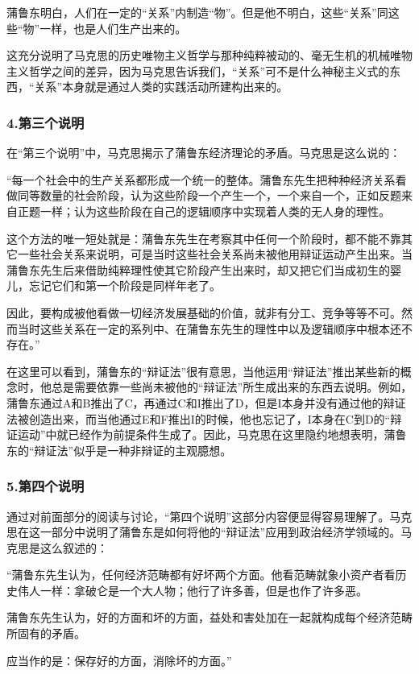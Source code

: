 \documentclass[a4paper,twoside,12pt,AutoFakeBold]{ctexart}
\begin{document}
\begin{adjustwidth}{2em}{2em}
    \qquad\fangsong
    蒲鲁东明白，人们在一定的“关系”内制造“物”。但是他不明白，这些“关系”同这些“物”一样，也是人们生产出来的。
\end{adjustwidth}
这充分说明了马克思的历史唯物主义哲学与那种纯粹被动的、毫无生机的机械唯物主义哲学之间的差异，因为马克思告诉我们，“关系”可不是什么神秘主义式的东西，“关系”本身就是通过人类的实践活动所建构出来的。

\subsubsection{4.第三个说明}

在“第三个说明”中，马克思揭示了蒲鲁东经济理论的矛盾。马克思是这么说的：

\begin{adjustwidth}{2em}{2em}
    \qquad\fangsong
    “每一个社会中的生产关系都形成一个统一的整体。蒲鲁东先生把种种经济关系看做同等数量的社会阶段，认为这些阶段一个产生一个，一个来自一个，正如反题来自正题一样；认为这些阶段在自己的逻辑顺序中实现着人类的无人身的理性。

这个方法的唯一短处就是：蒲鲁东先生在考察其中任何一个阶段时，都不能不靠其它一些社会关系来说明，可是当时这些社会关系尚未被他用辩证运动产生出来。当蒲鲁东先生后来借助纯粹理性使其它阶段产生出来时，却又把它们当成初生的婴儿，忘记它们和第一个阶段是同样年老了。

因此，要构成被他看做一切经济发展基础的价值，就非有分工、竞争等等不可。然而当时这些关系在一定的系列中、在蒲鲁东先生的理性中以及逻辑顺序中根本还不存在。”
\end{adjustwidth}
在这里可以看到，蒲鲁东的“辩证法”很有意思，当他运用“辩证法”推出某些新的概念时，他总是需要依靠一些尚未被他的“辩证法”所生成出来的东西去说明。例如，蒲鲁东通过A和B推出了C，再通过C和I推出了D，但是I本身并没有通过他的辩证法被创造出来，而当他通过E和F推出I的时候，他也忘记了，I本身在C到D的“辩证运动”中就已经作为前提条件生成了。因此，马克思在这里隐约地想表明，蒲鲁东的“辩证法”似乎是一种非辩证的主观臆想。

\subsubsection{5.第四个说明}

通过对前面部分的阅读与讨论，“第四个说明”这部分内容便显得容易理解了。马克思在这一部分中说明了蒲鲁东是如何将他的“辩证法”应用到政治经济学领域的。马克思是这么叙述的：

\begin{adjustwidth}{2em}{2em}
    \qquad\fangsong
“蒲鲁东先生认为，任何经济范畴都有好坏两个方面。他看范畴就象小资产者看历史伟人一样：拿破仑是一个大人物；他行了许多善，但是也作了许多恶。

蒲鲁东先生认为，好的方面和坏的方面，益处和害处加在一起就构成每个经济范畴所固有的矛盾。

应当作的是：保存好的方面，消除坏的方面。”
\end{adjustwidth}
\end{document}
